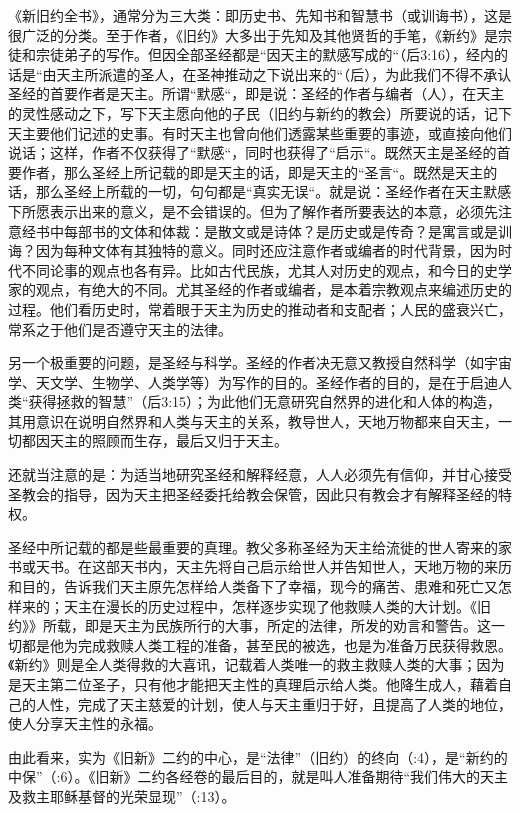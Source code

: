 《新旧约全书》，通常分为三大类：即历史书、先知书和智慧书（或训诲书），这是很广泛的分类。至于作者，《旧约》大多出于先知及其他贤哲的手笔，《新约》是宗徒和宗徒弟子的写作。但因全部圣经都是“因天主的默感写成的“（\uwave[弟]后3:16），经内的话是“由天主所派遣的圣人，在圣神推动之下说出来的“（\uwave[伯]后），为此我们不得不承认圣经的首要作者是天主。所谓“默感“，即是说：圣经的作者与编者（人），在天主的灵性感动之下，写下天主愿向他的子民（旧约与新约的教会）所要说的话，记下天主要他们记述的史事。有时天主也曾向他们透露某些重要的事迹，或直接向他们说话；这样，作者不仅获得了“默感“，同时也获得了“启示“。既然天主是圣经的首要作者，那么圣经上所记载的即是天主的话，即是天主的“圣言“。既然是天主的话，那么圣经上所载的一切，句句都是“真实无误“。就是说：圣经作者在天主默感下所愿表示出来的意义，是不会错误的。但为了解作者所要表达的本意，必须先注意经书中每部书的文体和体裁：是散文或是诗体？是历史或是传奇？是寓言或是训诲？因为每种文体有其独特的意义。同时还应注意作者或编者的时代背景，因为时代不同论事的观点也各有异。比如古代民族，尤其\UL[以色列]人对历史的观点，和今日的史学家的观点，有绝大的不同。尤其圣经的作者或编者，是本着宗教观点来编述历史的过程。他们看历史时，常着眼于天主为历史的推动者和支配者；人民的盛衰兴亡，常系之于他们是否遵守天主的法律。

另一个极重要的问题，是圣经与科学。圣经的作者决无意又教授自然科学（如宇宙学、天文学、生物学、人类学等）为写作的目的。圣经作者的目的，是在于启迪人类“获得拯救的智慧”（后3:15）；为此他们无意研究自然界的进化和人体的构造，其用意识在说明自然界和人类与天主的关系，教导世人，天地万物都来自天主，一切都因天主的照顾而生存，最后又归于天主。

还就当注意的是：为适当地研究圣经和解释经意，人人必须先有信仰，并甘心接受圣教会的指导，因为天主把圣经委托给教会保管，因此只有教会才有解释圣经的特权。

圣经中所记载的都是些最重要的真理。教父多称圣经为天主给流徙的世人寄来的家书或天书。在这部天书内，天主先将自己启示给世人并告知世人，天地万物的来历和目的，告诉我们天主原先怎样给人类备下了幸福，现今的痛苦、患难和死亡又怎样来的；天主在漫长的历史过程中，怎样逐步实现了他救赎人类的大计划。《旧约》》所载，即是天主为\UL[以色列]民族所行的大事，所定的法律，所发的劝言和警告。这一切都是他为完成救赎人类工程的准备，甚至\UL[以]民的被选，也是为准备万民获得救恩。《新约》则是全人类得救的大喜讯，记载着人类唯一的救主\UL[耶稣]\UL[基督]救赎人类的大事；因为\UL[耶稣]是天主第二位圣子，只有他才能把天主性的真理启示给人类。他降生成人，藉着自己的人性，完成了天主慈爱的计划，使人与天主重归于好，且提高了人类的地位，使人分享天主性的永福。

由此看来，\UL[耶稣]\UL[基督]实为《旧新》二约的中心，是“法律”（旧约）的终向（:4），是“新约的中保”（:6）。《旧新》二约各经卷的最后目的，就是叫人准备期待“我们伟大的天主及救主耶稣基督的光荣显现”（:13）。

